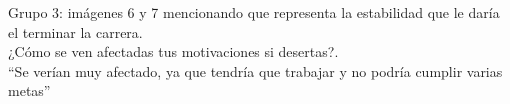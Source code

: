Grupo 3: imágenes 6 y 7 mencionando que representa la estabilidad que le daría el terminar la carrera.\\


¿Cómo se ven afectadas tus motivaciones si desertas?.\\

``Se verían muy afectado, ya que tendría que trabajar y no podría cumplir varias metas''\\





